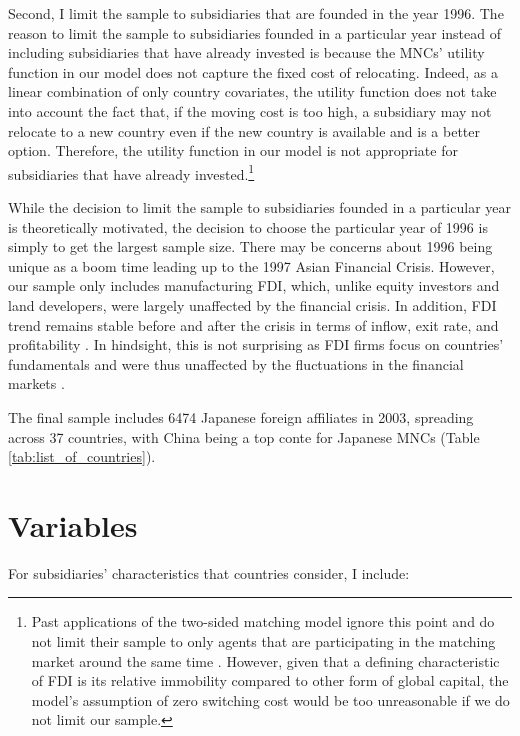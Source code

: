 Second, I limit the sample to subsidiaries that are founded in the year 1996. The
reason to limit the sample to subsidiaries founded in a particular year instead
of including subsidiaries that have already invested is because the MNCs'
utility function in our model does not capture the fixed cost of relocating.
Indeed, as a linear combination of only country covariates, the utility function
does not take into account the fact that, if the moving cost is too high, a
subsidiary may not relocate to a new country even if the new country is
available and is a better option. Therefore, the utility function in our model
is not appropriate for subsidiaries that have already invested.\footnote{Past
applications of the two-sided matching model ignore this point and do not limit
their sample to only agents that are participating in the matching market around
the same time \citep{Logan1996, Logan2008}. However, given that a defining
characteristic of FDI is its relative immobility compared to other form of
global capital, the model's assumption of zero switching cost would be too
unreasonable if we do not limit our sample.}

While the decision to limit the sample to subsidiaries founded in a particular
year is theoretically motivated, the decision to choose the particular year of
1996 is simply to get the largest sample size. There may be concerns about 1996
being unique as a boom time leading up to the 1997 Asian Financial Crisis.
However, our sample only includes manufacturing FDI, which, unlike equity
investors and land developers, were largely unaffected by the financial crisis.
In addition, FDI trend remains stable before and after the crisis in terms of
inflow, exit rate, and profitability \citep{Delios2001, UNCTAD1998}. In
hindsight, this is not surprising as FDI firms focus on countries' fundamentals
and were thus unaffected by the fluctuations in the financial markets
\citep{Ahlquist2006}.

The final sample includes 6474 Japanese foreign affiliates in 2003, spreading
across 37 countries, with China being a top conte
for Japanese MNCs (Table \ref{tab:list_of_countries}).

\section{Variables}

For subsidiaries' characteristics that countries consider, I include:


